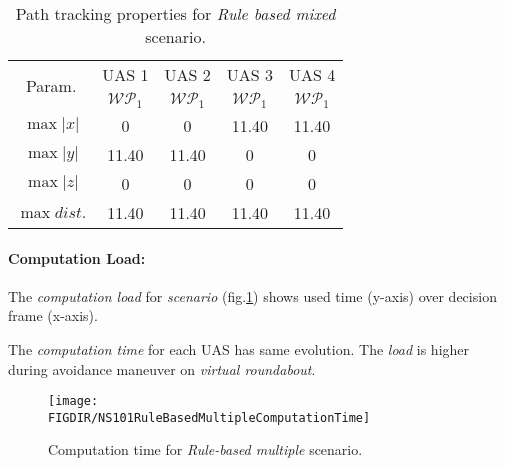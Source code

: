     \begin{table}[H]
        \centering
        \begin{tabular}{c||c|c|c|c}
            \multirow{2}{*}{Param.} & UAS 1     & UAS 2             & UAS 3             & UAS 4 \\\cline{2-5}
                            & $\mathscr{WP}_1$  & $\mathscr{WP}_1$  & $\mathscr{WP}_1$  & $\mathscr{WP}_1$ \\\hline\hline
              $\max |x|$    & 0                 & 0                 & 11.40             & 11.40\\\hline
              $\max |y|$    & 11.40             & 11.40             & 0                 & 0\\\hline
              $\max |z|$    & 0                 & 0                 & 0                 & 0\\\hline
              $\max dist.$  & 11.40             & 11.40             & 11.40              & 11.40\\
        \end{tabular}
        \caption{Path tracking properties for \emph{Rule based mixed} scenario.}
        \label{tab:pathTrackingParametersForRuleBasedMixed}
    \end{table}
    
    
\paragraph{Computation Load:} The \emph{computation load} for \emph{scenario} (fig.\ref{fig:ruleBasedMultipleComputationTime}) shows used time (y-axis) over decision frame (x-axis).

The \emph{computation time} for each UAS has same evolution. The \emph{load} is higher  during avoidance maneuver on \emph{virtual roundabout}.

\begin{figure}[H]
    \centering
    \texttt{[image: \\FIGDIR/NS101RuleBasedMultipleComputationTime]} 
    \caption{Computation time for \emph{Rule-based multiple} scenario.}
    \label{fig:ruleBasedMultipleComputationTime}
\end{figure}